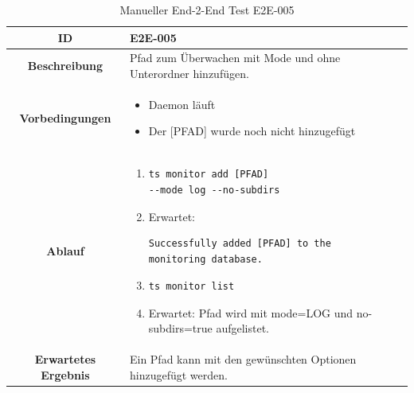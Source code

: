 \documentclass[a4paper,12pt]{report}
\begin{document}
    \begin{table}[h!]
        \centering
        \setlength{\leftmargini}{0.8cm}
        \begin{tabular}{|c|p{10cm}|}
            \hline
            \textbf{ID}                  & E2E-005                                                        \\ \hline
            \textbf{Beschreibung}        & Pfad zum Überwachen mit Mode und ohne Unterordner hinzufügen.  \\ \hline
            \textbf{Vorbedingungen} &
            \begin{itemize}
                \item Daemon läuft
                \item  Der [PFAD] wurde noch nicht hinzugefügt
            \end{itemize} \\ \hline
            \textbf{Ablauf} &
            \begin{enumerate}
                \item \begin{verbatim}ts monitor add [PFAD]
--mode log --no-subdirs
                \end{verbatim}
                \item Erwartet: \begin{verbatim}Successfully added [PFAD] to the
monitoring database.
                \end{verbatim}
                \item \begin{verbatim}ts monitor list
                \end{verbatim}
                \item Erwartet: Pfad wird mit mode=LOG und no-subdirs=true aufgelistet.
            \end{enumerate} \\ \hline
            \textbf{Erwartetes Ergebnis} & Ein Pfad kann mit den gewünschten Optionen hinzugefügt werden. \\ \hline
        \end{tabular}
        \caption{Manueller End-2-End Test E2E-005}\label{tab:e2e-5}
    \end{table}
\end{document}
